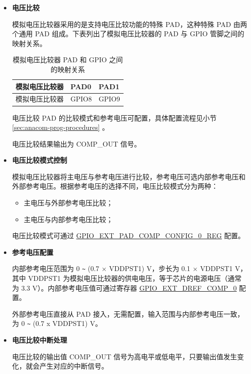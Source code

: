 \documentclass[main\_\_CN.tex]{subfiles}
\begin{document}
\begin{itemize}

    \item {\bfseries 电压比较}

          模拟电压比较器采用的是支持电压比较功能的特殊 PAD，这种特殊 PAD 由两个通用 PAD 组成。下表列出了模拟电压比较器的 PAD 与 GPIO 管脚之间的映射关系。

          \begin{longtable}{ | L{5cm} | L{2cm} | L{2cm} | }
          \caption{模拟电压比较器 PAD 和 GPIO 之间的映射关系} \label{tab:anacom-pad-gpio-mapping}\\ \hline
          \textbf{模拟电压比较器} & \textbf{PAD0}  &  \textbf{PAD1}\\ \hline
          模拟电压比较器 & GPIO8  &  GPIO9  \\ \hline

          \end{longtable}

          电压比较 PAD 的比较模式和参考电压可配置，具体配置流程见小节 \ref{sec:anacom-prog-procedures} 。

          电压比较结果输出为 COMP\_OUT 信号。

    \item {\bfseries 电压比较模式控制}

          模拟电压比较器将主电压与参考电压进行比较，参考电压可选内部参考电压和外部参考电压。根据参考电压的选择不同，电压比较模式分为两种：

          \begin{itemize}
            \item 主电压与外部参考电压比较；
            \item 主电压与内部参考电压比较；
          \end{itemize}

          电压比较模式可通过 \hyperref[regdesc:GPIOEXTPADCOMPCONFIG0REG]{GPIO\_EXT\_PAD\_COMP\_CONFIG\_0\_REG}  配置。

    \item {\bfseries 参考电压配置}

          内部参考电压范围为 0 \verb+~+ (0.7 × VDDPST1) V，步长为 0.1 × VDDPST1 V，其中 VDDPST1 为模拟电压比较器的供电电压，等于芯片的电源电压（通常为 3.3 V）。内部参考电压值可通过寄存器 \hyperref[fielddesc:GPIOEXTDREFCOMP0]{GPIO\_EXT\_DREF\_COMP\_0} 配置。

          外部参考电压直接从 PAD 接入，无需配置，输入范围与内部参考电压一致，为 0 \verb+~+ (0.7 x VDDPST1) V。

    \item {\bfseries 电压比较中断处理}

          电压比较的输出值 COMP\_OUT 信号为高电平或低电平，只要输出值发生变化，就会产生对应的中断信号。

\end{itemize}
\end{document}
